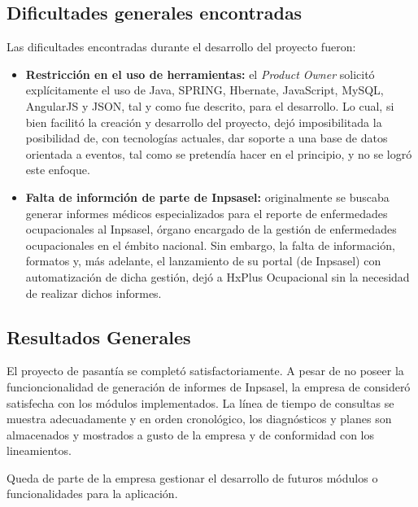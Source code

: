     \subsection{Dificultades generales encontradas}
    
    Las dificultades encontradas durante el desarrollo del proyecto fueron:
    
    \begin{itemize}
        \item \textbf{Restricción en el uso de herramientas:} el \textit{Product Owner} solicitó explícitamente el uso de Java, SPRING, Hbernate, JavaScript, MySQL, AngularJS y JSON, tal y como fue descrito, para el desarrollo. Lo cual, si bien facilitó la creación y desarrollo del proyecto, dejó imposibilitada la posibilidad de, con tecnologías actuales, dar soporte a una base de datos orientada a eventos, tal como se pretendía hacer en el principio, y no se logró este enfoque.
        
        \item \textbf{Falta de informción de parte de Inpsasel:} originalmente se buscaba generar informes médicos especializados para el reporte de enfermedades ocupacionales al Inpsasel, órgano encargado de la gestión de enfermedades ocupacionales en el émbito nacional. Sin embargo, la falta de información, formatos y, más adelante, el lanzamiento de su portal (de Inpsasel) con automatización de dicha gestión, dejó a HxPlus Ocupacional sin la necesidad de realizar dichos informes.
    \end{itemize}
    
    \subsection{Resultados Generales}
    
    El proyecto de pasantía se completó satisfactoriamente. A pesar de no poseer la funcioncionalidad de generación de informes de Inpsasel, la empresa de consideró satisfecha con los módulos implementados. La línea de tiempo de consultas se muestra adecuadamente y en orden cronológico, los diagnósticos y planes son almacenados y mostrados a gusto de la empresa y de conformidad con los lineamientos.
    
    Queda de parte de la empresa gestionar el desarrollo de futuros módulos o funcionalidades para la aplicación.
    
    
    
\pagebreak